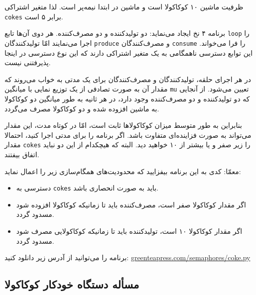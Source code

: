 \documentclass{book}
\newcommand{\clearemptydoublepage}{}%
\begin{document}
    ظرفیت ماشین ۱۰ کوکاکولا است و ماشین در ابتدا نیمه‌پر است. لذا متغیر اشتراکی {\tt cokes} برابر ۵ است. 

    برنامه ۴ نخ ایجاد می‌نماید: دو تولیدکننده و دو مصرف‌کننده. 
    هر دوی آن‌ها تابع {\tt loop} را اجرا می‌نمایند امّا تولیدکنندگان  {\tt produce}  و مصرف‌کنندگان {\tt consume} را فرا می‌خواند. 
    این توابع دسترسی ناهمگامی به یک متغیر اشتراکی دارند که این نوع دسترسی در اینجا پذیرفتنی نیست. 

    در هر اجرای حلقه، تولیدکنندگان و مصرف‌کنندگان برای یک مدتی به خواب می‌روند که مقدار آن به صورت تصادفی 
    از یک توزیع نمایی با میانگین  {\tt mu} تعیین می‌شود. از آنجایی که دو تولیدکننده و دو مصرف‌کننده وجود دارد، در هر ثانیه به طور میانگین 
    دو کوکاکولا به ماشین افزوده شده و دو کوکاکولا مصرف می‌گردد. 

    بنابراین به طور متوسط میزان کوکاکولاها ثابت است، امّا در کوتاه مدت، این مقدار می‌تواند به صورت فزاینده‌ای متفاوت باشد.
    اگر برنامه را برای مدتی اجرا کنید، احتمالا مقدار  {\tt cokes}  را زیر صفر و یا بیشتر از ۱۰ خواهید دید. البته که هیچکدام از این دو نباید اتفاق بیفتند. 
    
    معمّا: کدی به این برنامه بیفزایید که محدودیت‌های همگام‌سازی زیر را اعمال نماید:

\begin{itemize}

\item
    دسترسی به {\tt cokes} باید به صورت انحصاری باشد. 

\item
    اگر مقدار کوکاکولا صفر است، مصرف‌کننده باید تا زمانیکه کوکاکولا افزوده شود مسدود گردد. 

\item
    اگر مقدار کوکاکولا ۱۰ است، تولید‌کننده باید تا زمانیکه کوکاکولایی مصرف شود مسدود گردد. 

\end{itemize}

    برنامه را می‌توانید از آدرس زیر دانلود کنید:
\url{greenteapress.com/semaphores/coke.py}


\clearemptydoublepage
\subsection {مسأله دستگاه خودکار کوکاکولا}
\end{document}
